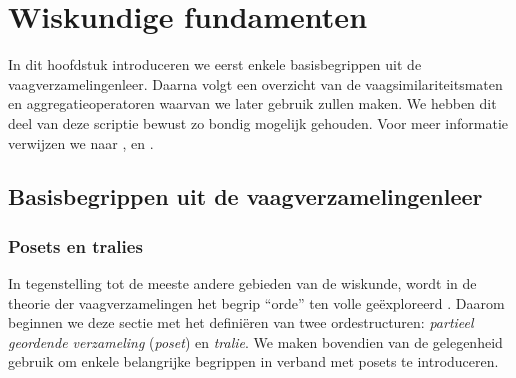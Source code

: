 \chapter{Wiskundige fundamenten}

In dit hoofdstuk introduceren we eerst enkele basisbegrippen uit de vaagverzamelingenleer. 
Daarna volgt een overzicht van de vaagsimilariteitsmaten en aggregatieoperatoren waarvan
we later gebruik zullen maken. We hebben dit deel van deze scriptie bewust zo 
bondig mogelijk gehouden. Voor meer informatie verwijzen
we naar \cite{kerre:vaagmodellen}, \cite{vanderweken:similariteitsmaten} en 
\cite{victor:aggregatieoperatoren}.


\section{Basisbegrippen uit de vaagverzamelingenleer}

\subsection{Posets en tralies}
\label{sectie:posets_en_tralies}

In tegenstelling tot de meeste andere gebieden van de wiskunde, wordt in de theorie der 
vaagverzamelingen het begrip ``orde'' ten volle ge\"exploreerd \cite{kerre:vaagmodellen}. Daarom beginnen we deze 
sectie met het defini\"eren van twee ordestructuren: \emph{partieel geordende verzameling} 
(\emph{poset}) en \emph{tralie}. We maken bovendien van de gelegenheid gebruik om enkele 
belangrijke begrippen in verband met posets te introduceren. 

